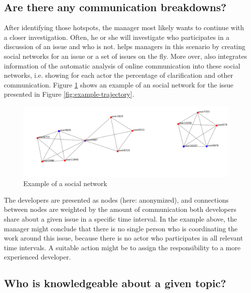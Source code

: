 \subsection{Are there any communication breakdowns?}
After identifying those hotspots, the manager most likely wants to continue with a closer investigation. 
Often, he or she will investigate who participates in a discussion of an issue and who is not.
\viss helps managers in this scenario by creating social networks for an issue or a set of issues on the fly.
More over, \viss also integrates information of the automatic analysis of online communication into these social networks, i.e. showing for each actor the percentage of clarification and other communication.
Figure \ref{fig:example-sn} shows an example of an social network for the issue presented in Figure \ref{fig:example-trajectory}. 
\begin{figure}
\includegraphics[width=\columnwidth]{img/example-sn}
\caption{Example of a social network}
\label{fig:example-sn}
\end{figure}
The developers are presented as nodes (here: anonymized), and connections between nodes are weighted by the amount of communication both developers share about a given issue in a specific time interval. 
In the example above, the manager might conclude that there is no single person who is coordinating the work around this issue, because there is no actor who participates in all relevant time intervals.
A suitable action might be to assign the responsibility to a more experienced developer.

\subsection{Who is knowledgeable about a given topic?}

